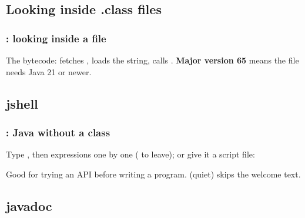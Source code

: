\documentclass[aspectratio=169,10pt,compress]{beamer}
\begin{document}
\subsection[javap]{Looking inside .class files}




\begin{frame}[t,fragile] \frametitle{: looking inside a  file}

  \vspace{0.1em}
  \small
  The bytecode:  fetches ,  loads the string,  calls .
  \textbf{Major version 65} means the file needs Java 21 or newer.
\end{frame}

\subsection[jshell]{jshell}




\begin{frame}[t,fragile] \frametitle{: Java without a class}
  \small Type , then expressions one by one ( to leave); or give it a script file:


  \vspace{0.1em}
  \small Good for trying an API before writing a program.  (quiet) skips the welcome text.
\end{frame}

\subsection[javadoc]{javadoc}
\end{document}
